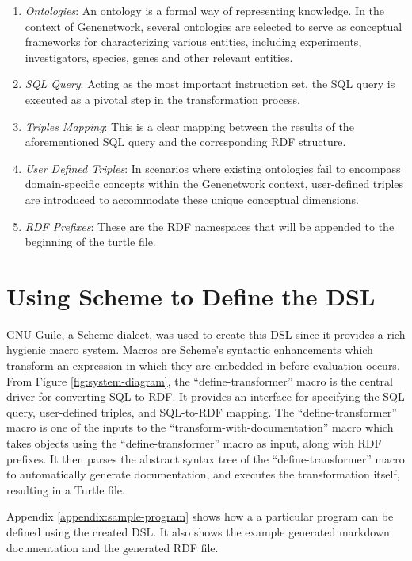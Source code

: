 \documentclass{article}
\begin{document}
\begin{enumerate}
\item \textit{Ontologies}: An ontology is a formal way of representing knowledge.  In the context of Genenetwork, several ontologies are selected to serve as conceptual frameworks for characterizing various entities, including experiments, investigators, species, genes and other relevant entities.
\item \textit{SQL Query}: Acting as the most important instruction set, the SQL query is executed as a pivotal step in the transformation process.
\item \textit{Triples Mapping}: This is a clear mapping between the results of the aforementioned SQL query and the corresponding RDF structure.
\item \textit{User Defined Triples}: In scenarios where existing ontologies fail to encompass domain-specific concepts within the Genenetwork context, user-defined triples are introduced to accommodate these unique conceptual dimensions.
\item \textit{RDF Prefixes}: These are the RDF namespaces that will be appended to the beginning of the turtle file.
\end{enumerate}

\section{Using Scheme to Define the DSL}

GNU Guile, a Scheme dialect, was used to create this DSL since it provides a rich hygienic macro system.  Macros are Scheme's syntactic enhancements which transform an expression in which they are embedded in before evaluation occurs.  From Figure \ref{fig:system-diagram}, the ``define-transformer'' macro is the central driver for converting SQL to RDF.  It provides an interface for specifying the SQL query, user-defined triples, and SQL-to-RDF mapping.  The ``define-transformer'' macro is one of the inputs to the ``transform-with-documentation'' macro which takes objects using the ``define-transformer'' macro as input, along with RDF prefixes.  It then parses the abstract syntax tree of the ``define-transformer'' macro to automatically generate documentation, and executes the transformation itself, resulting in a Turtle file.

Appendix \ref{appendix:sample-program} shows how a a particular program can be defined using the created DSL.  It also shows the example generated markdown documentation and the generated RDF file.
\end{document}
